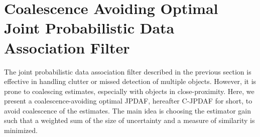 \documentclass[letterpaper, 10pt, conference]{ieeeconf}
\newcommand{\bracket}[1]{\ensuremath{\left[ #1 \right]}}
\newcommand{\tr}[1]{\mathrm{tr}\ensuremath{\negthickspace\bracket{#1}}}
\newcommand{\EditTL}[1]{{\color{red}\protect #1}}
\begin{document}



\section{Coalescence Avoiding Optimal Joint Probabilistic Data Association Filter}%
\label{C-JPDAF}

The joint probabilistic data association filter described in the previous section is effective in handling clutter or missed detection of multiple objects. However, it is prone to coalescing estimates, especially with objects in close-proximity. Here, we present a coalescence-avoiding optimal JPDAF, hereafter C-JPDAF for short, to avoid coalescence of the estimates. The main idea is choosing the estimator gain such that a weighted sum of the size of uncertainty and a measure of similarity is minimized. 
\end{document}

